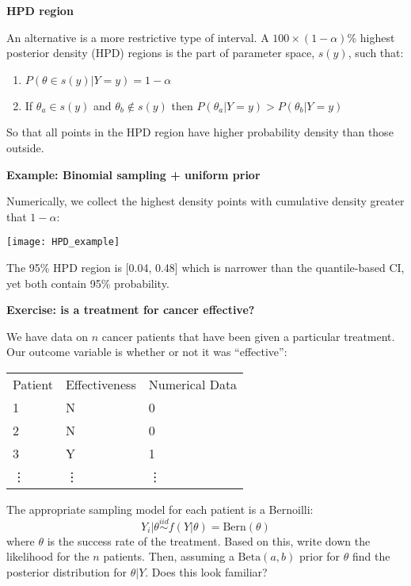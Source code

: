 \documentclass[12pt,xcolor=svgnames]{beamer}
\newcommand{\theme}{\color{FireBrick}}
\newcommand{\fb}{\color{FireBrick}}
\newcommand{\mr}[1]{\mathrm{#1}}
\newcommand{\sk}{\vspace{.4cm}}
\newcommand{\nochap}{\vspace{0.5cm}}
\newcommand{\chap}[1]{{\theme \Large \bf #1} \sk}
\begin{document}
\begin{frame}
\chap{HPD region}

An alternative is a more restrictive type of interval. A $100 \times(1-\alpha)$\% highest posterior density (HPD) regions is the part of parameter space, $s(y)$, such that:
\begin{enumerate}
\item $P(\theta \in s(y) |Y=y)= 1-\alpha$
\item If $\theta_a \in s(y)$ and $\theta_b \notin s(y)$ then $P(\theta_a |Y=y)>P(\theta_b |Y=y)$
\end{enumerate}
So that all points in the HPD region have higher probability density than those outside.

\end{frame}


\begin{frame}
\chap{Example: Binomial sampling + uniform prior}

Numerically, we collect the highest density points with cumulative density greater that $1-\alpha$: 
\begin{center}
\texttt{[image: HPD\_example]}
\end{center}
The 95\% HPD region is [0.04, 0.48] which is narrower than the quantile-based CI, yet both contain 95\% probability.
\end{frame}


\begin{frame}
\nochap
{\bf \fb Exercise: is a treatment for cancer effective?}\\

{\footnotesize
We have data on $n$ cancer patients that have been given a particular treatment. Our outcome variable is whether or not it was ``effective'':
\begin{center}
 \begin{tabular}{lll}
Patient & Effectiveness & Numerical Data \\
1& N& 0\\
2&N&0\\
3&Y&1\\
\vdots &\vdots &\vdots \\
\end{tabular}
\end{center}
The appropriate sampling model for each patient is a Bernoilli:
$$Y_i|\theta  \stackrel{iid}{\sim} f(Y|\theta) = \text{Bern}(\theta)$$ 
where $\theta$ is the success rate of the treatment. Based on this, write down the likelihood for the $n$ patients. Then, assuming a $\mr{Beta}(a,b)$ prior for $\theta$ find the posterior distribution for $\theta|Y$. Does this look familiar?
}


\end{frame}
\end{document}
